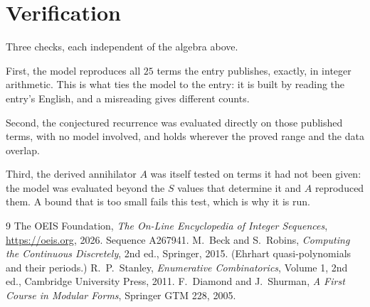 \documentclass[11pt,a4paper]{article}
\theoremstyle{plain}
\theoremstyle{definition}
\begin{document}
\section{Verification}

Three checks, each independent of the algebra above.

First, the model reproduces all $25$ terms the entry publishes, exactly, in integer
arithmetic. This is what ties the model to the entry: it is built by reading the entry's
English, and a misreading gives different counts.

Second, the conjectured recurrence was evaluated directly on those published terms, with no
model involved, and holds wherever the proved range and the data overlap.

Third, the derived annihilator $A$ was itself tested on terms it had not been given: the model
was evaluated beyond the $S$ values that determine it and $A$ reproduced them. A bound that is
too small fails this test, which is why it is run.

\begin{thebibliography}{9}
 The OEIS Foundation, \emph{The On-Line Encyclopedia of Integer
Sequences}, \url{https://oeis.org}, 2026. Sequence A267941.
 M.~Beck and S.~Robins, \emph{Computing the Continuous Discretely},
2nd ed., Springer, 2015. (Ehrhart quasi-polynomials and their periods.)
 R.~P.~Stanley, \emph{Enumerative Combinatorics}, Volume 1, 2nd ed.,
Cambridge University Press, 2011.
 F.~Diamond and J.~Shurman, \emph{A First Course in Modular Forms},
Springer GTM 228, 2005.
\end{thebibliography}
\end{document}
